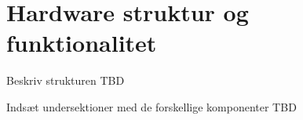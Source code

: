 \section{Hardware struktur og funktionalitet}
Beskriv strukturen TBD

Indsæt undersektioner med de forskellige komponenter TBD